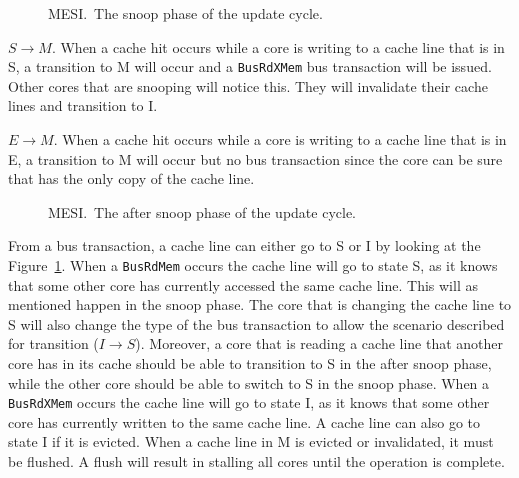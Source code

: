 \begin{figure}[ht]
    \centering
    \caption{MESI.\ The snoop phase of the update cycle.}\label{fig:mesi_snoop}
\end{figure}


$S \to M$.
When a cache hit occurs while a core is writing to a cache line that is in S, a transition to M will occur and a \texttt{BusRdXMem} bus transaction will be issued.
Other cores that are snooping will notice this.
They will invalidate their cache lines and transition to I.


$E \to M$.
When a cache hit occurs while a core is writing to a cache line that is in E, a
transition to M will occur but no bus transaction since the core can be sure that
has the only copy of the cache line.



\begin{figure}[ht]
    \centering
    \caption{MESI.\ The after snoop phase of the update cycle.}\label{fig:mesi_after_snoop}
\end{figure}

From a bus transaction, a cache line can either go to S or I by looking at the Figure~\ref{fig:mesi_snoop}.
When a \texttt{BusRdMem} occurs the cache line will go to state S, as it knows that some other core has currently accessed the same cache line.
This will as mentioned happen in the snoop phase.
The core that is changing the cache line to S will also change the type of the bus transaction to allow the scenario described for transition ($I \to S$).
Moreover, a core that is reading a cache line that another core has in its cache should be able to transition to S in the after snoop phase, while the other core should be able to switch to S in the snoop phase.
When a \texttt{BusRdXMem} occurs the cache line will go to state I, as it knows that some other core has currently written to the same cache line.
A cache line can also go to state I if it is evicted.
When a cache line in M is evicted or invalidated, it must be flushed.
A flush will result in stalling all cores until the operation is complete.

